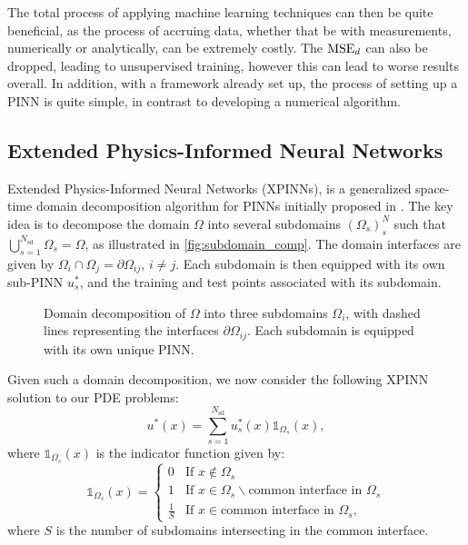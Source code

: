 The total process of applying machine learning techniques can then be quite beneficial, as the process of accruing data, whether that be with measurements, numerically or analytically, can be extremely costly.
The $\operatorname{MSE}_d$ can also be dropped, leading to unsupervised training, however this can lead to worse results overall.
In addition, with a framework already set up, the process of setting up a PINN is quite simple, in contrast to developing a numerical algorithm.

\subsection{Extended Physics-Informed Neural Networks}
Extended Physics-Informed Neural Networks (XPINNs), is a generalized space-time domain decomposition algorithm for PINNs initially proposed in \textcite{Jagtap2020ExtendedPN}.
The key idea is to decompose the domain $\Omega$ into several subdomains $(\Omega_s)_s^N$ such that $\bigcup_{s=1}^{N_\mathrm{sd}}\Omega_s=\Omega$, as illustrated in \autoref{fig:subdomain_comp}.
The domain interfaces are given by $\Omega_i\cap \Omega_j = \partial\Omega_{ij},\, i\neq j$.
Each subdomain is then equipped with its own sub-PINN $u^*_s$, and the training and test points associated with its subdomain.

\begin{figure}[h]
\centering

\caption{Domain decomposition of $\Omega$ into three subdomains $\Omega_i$, with dashed lines representing the interfaces $\partial \Omega_{ij}$. Each subdomain is equipped with its own unique PINN. }
\label{fig:subdomain_comp}
\end{figure}

Given such a domain decomposition, we now consider the following XPINN solution to our PDE problems:
\begin{equation}\label{eq:XPINN}
    u^* (x)=\sum_{s=1}^{N_\mathrm{sd}} u_{s}^*(x) \mathds{1}_{\Omega_s}(x),
\end{equation}
where $\mathds{1}_{\Omega_s}(x)$ is the indicator function given by:
\begin{equation}
    \mathds{1}_{\Omega_s}(x)=
    \begin{cases}
        0 &\text{If } x \notin \Omega_s \\
        1 &\text{If } x \in \Omega_s \backslash \text{common interface in } \Omega_s \\
        \frac{1}{S} &\text{If } x \in \text{common interface in } \Omega_s,
    \end{cases}
\end{equation}
where $S$ is the number of subdomains intersecting in the common interface.

